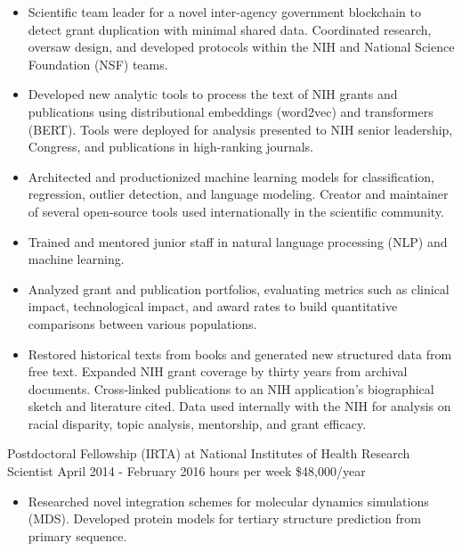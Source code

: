 \documentclass[]{scrartcl}
\begin{document}
\begin{cleanCV}
{\begin{itemize}
    \item Scientific team leader for a novel inter-agency government blockchain to detect grant duplication with minimal shared data. Coordinated research, oversaw design, and developed protocols within the NIH and National Science Foundation (NSF) teams.

    \item Developed new analytic tools to process the text of NIH grants and publications using distributional embeddings (word2vec) and transformers (BERT). Tools were deployed for analysis presented to NIH senior leadership, Congress, and publications in high-ranking journals.

    \item Architected and productionized machine learning models for classification, regression, outlier detection, and language modeling. Creator and maintainer of several open-source tools used internationally in the scientific community.

      \item Trained and mentored junior staff in natural language processing (NLP) and machine learning.
  
  \item Analyzed grant and publication portfolios, evaluating metrics such as clinical impact, technological impact, and award rates to build quantitative comparisons between various populations.
    
  \item Restored historical texts from books and generated new structured data from free text. Expanded NIH grant coverage by thirty years from archival documents. Cross-linked publications to an NIH application's biographical sketch and literature cited. Data used internally with the NIH for analysis on racial disparity, topic analysis, mentorship, and grant efficacy.    
    
  \end{itemize}
}

\vspace{0.5em}
 
\WorkExperience
{}
{Postdoctoral Fellowship (IRTA) at National Institutes of Health}
{\newline Research Scientist}
{
  \newline April 2014 - February 2016
   hours per week
  \newline \$48,000/year
}
{
  \begin{itemize}
  \item Researched novel integration schemes for molecular dynamics simulations (MDS). Developed protein models for tertiary structure prediction from primary sequence.


\end{itemize}}
\end{cleanCV}
\end{document}
